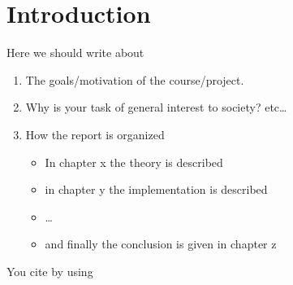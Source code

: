 \section{Introduction}\label{sec:intro}
Here we should write about
\begin{enumerate}[i]
	\item The goals/motivation of the course/project.
	\item Why is your task of general interest to society? etc\dots
	\item How the report is organized
	\begin{itemize}
		\item In chapter x the theory is described
		\item in chapter y the implementation is described
		\item \dots
		\item and finally the conclusion is given in chapter z
	\end{itemize}
\end{enumerate}

You cite by using \cite{Chen2014}